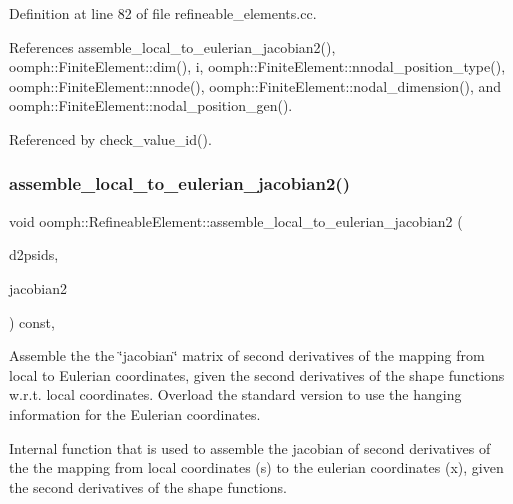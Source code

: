 Definition at line 82 of file refineable\+\_\+elements.\+cc.



References assemble\+\_\+local\+\_\+to\+\_\+eulerian\+\_\+jacobian2(), oomph\+::\+Finite\+Element\+::dim(), i, oomph\+::\+Finite\+Element\+::nnodal\+\_\+position\+\_\+type(), oomph\+::\+Finite\+Element\+::nnode(), oomph\+::\+Finite\+Element\+::nodal\+\_\+dimension(), and oomph\+::\+Finite\+Element\+::nodal\+\_\+position\+\_\+gen().



Referenced by check\+\_\+value\+\_\+id().

\mbox{\label{classoomph_1_1RefineableElement_a16ee7ab5ebf6d105815d49e1a23aa2ca}} 
\subsubsection{\texorpdfstring{assemble\+\_\+local\+\_\+to\+\_\+eulerian\+\_\+jacobian2()}{assemble\_local\_to\_eulerian\_jacobian2()}}
{\footnotesize\ttfamily void oomph\+::\+Refineable\+Element\+::assemble\+\_\+local\+\_\+to\+\_\+eulerian\+\_\+jacobian2 (\begin{DoxyParamCaption}\item[{const \hyperlink{classoomph_1_1DShape}{D\+Shape} \&}]{d2psids,  }\item[{\hyperlink{classoomph_1_1DenseMatrix}{Dense\+Matrix}$<$ double $>$ \&}]{jacobian2 }\end{DoxyParamCaption}) const\hspace{0.3cm}{\ttfamily [protected]}, {\ttfamily [virtual]}}



Assemble the the \char`\"{}jacobian\char`\"{} matrix of second derivatives of the mapping from local to Eulerian coordinates, given the second derivatives of the shape functions w.\+r.\+t. local coordinates. Overload the standard version to use the hanging information for the Eulerian coordinates. 

Internal function that is used to assemble the jacobian of second derivatives of the the mapping from local coordinates (s) to the eulerian coordinates (x), given the second derivatives of the shape functions. 

